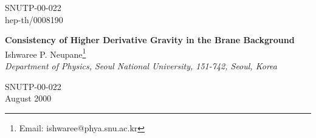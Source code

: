 \documentclass[a4paper,12pt]{article}
\begin{document}
\topmargin -0.8cm
\oddsidemargin -0.8cm
\evensidemargin -0.8cm
\pagestyle{empty}
\begin{flushright}
SNUTP-00-022\\
hep-th/0008190
\end{flushright}
\begin{center}
{\large\bf Consistency of Higher Derivative Gravity in the Brane Background}\\
\vspace{0.6cm}
{\large Ishwaree P. Neupane\footnote{Email: ishwaree@phya.snu.ac.kr}}\\
\vspace{0.4cm}
{\it{Department of Physics, Seoul National University, 151-742, Seoul, 
Korea}}\\
\end{center}
\vspace{1cm}
\begin{abstract}
We consider the theory of higher derivative gravity with non-factorizable 
Randall-Sundrum type space-time and obtain the metric solutions 
which characterize the $p$-brane world-volume as a curved or planar defect 
embedded in the higher dimensions. We consider the string inspired effective 
action of the dilatonic Gauss-Bonnet type in the brane background and show 
its consistency with the RS brane-world scenario and the conformal 
weights of dilaton couplings in the string theory with appropriate 
choice of Regge slope ($\alpha'$) or Gauss-Bonnet coupling ($\alpha$) 
or both. We also discuss time dependent dilaton solutions 
for a version of string-inspired fourth-derivative gravity model. 
\end{abstract}
\begin{flushleft}
SNUTP-00-022\\
August 2000
\end{flushleft}
\vfill
\eject
\pagestyle{empty}
\setcounter{page}{1}
\setcounter{footnote}{0}
\pagestyle{plain}
\end{document}
